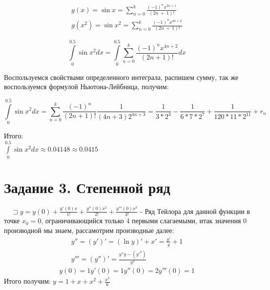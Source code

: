 \documentclass{article}
\begin{document}
\begin{align}
    g(x) = \sin{x}
     = \sum_{n=0}^{k}\frac{\left(-1\right)^{n}x^{2n+1}}{\left(2n\ +\ 1\right)!}\\
    g(x^2) = \sin{x^2}
     = \sum_{n=0}^{k}\frac{\left(-1\right)^{n}x^{4n+2}}{\left(2n\ +\ 1\right)!}
\end{align}
    
\begin{equation}
    \int\limits_{0}^{0.5}\sin{x^2}dx = \int\limits_{0}^{0.5}\sum_{n=0}^{k}\frac{(-1)^{n}x^{4n+2}}{(2n+1)!}dx
\end{equation}

Воспользуемся свойствами определенного интеграла, распишем сумму, так же воспользуемся формулой Ньютона-Лейбница, получим:

\begin{equation}
    \int\limits_{0}^{0.5}\sin{x^2}dx = \sum_{n=0}^{k}\frac{(-1)^n}{(2n+1)!}\frac{1}{(4n + 3)2^{4n+3}} = \frac{1}{3*2^3} - \frac{1}{6 * 7 * 2^7} + \frac{1}{120 * 11 * 2^{11}} + r_n 
\end{equation}

Итого: 
\\
$\int\limits_{0}^{0.5}\sin{x^2}dx \approx 0.04148 \approx 0.0415$

\section{Задание 3. Степенной ряд}

$\quad\sqsupset y = y(0) + \frac{y'(0)x}{1!} + \frac{y''(0)x^2}{2!} + \frac{y'''(0)x^3}{3!}$ - Ряд Тейлора для данной функции в точке $x_0 = 0$, ограничивающийся только 4 первыми слагаемыми, итак значения 0 производной мы знаем, рассамотрим производные далее:
\begin{align}
    y'' = (y')' = (\ln{y})' + x' = \frac{y'}{y} + 1\\
    y''' = (y'')' = \frac{y''y - (y'^2)}{y^2}
\end{align}
\begin{align}    
    y(0) = 1
    y'(0) = 1
    y''(0) = 2
    y'''(0) = 1
\end{align}
Итого получим:
$y = 1 + x + x^2 + \frac{x^3}{6}$
\end{document}
